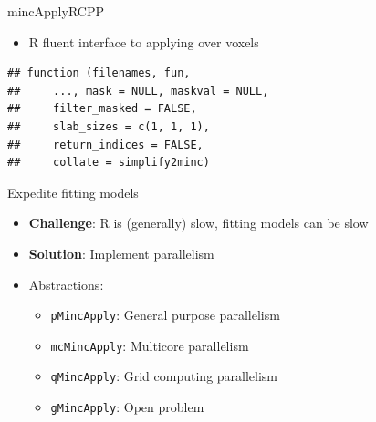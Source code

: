 \begin{frame}[fragile]{mincApplyRCPP}

\begin{itemize}
\tightlist
\item
  R fluent interface to applying over voxels
\end{itemize}

\begin{Shaded}
\begin{Highlighting}[]
\NormalTok{(}
\end{Highlighting}
\end{Shaded}

\begin{verbatim}
## function (filenames, fun, 
##     ..., mask = NULL, maskval = NULL, 
##     filter_masked = FALSE, 
##     slab_sizes = c(1, 1, 1), 
##     return_indices = FALSE, 
##     collate = simplify2minc)
\end{verbatim}

\begin{Shaded}
\begin{Highlighting}[]
 \NormalTok{)}
\end{Highlighting}
\end{Shaded}

\end{frame}

\begin{frame}{Expedite fitting models}

\begin{itemize}
\tightlist
\item
  \textbf{Challenge}: R is (generally) slow, fitting models can be slow
\item
  \textbf{Solution}: Implement parallelism
\item
  Abstractions:

  \begin{itemize}
  \tightlist
  \item
    \texttt{pMincApply}: General purpose parallelism
  \item
    \texttt{mcMincApply}: Multicore parallelism
  \item
    \texttt{qMincApply}: Grid computing parallelism
  \item
    \texttt{gMincApply}: Open problem
  \end{itemize}
\end{itemize}

\end{frame}

